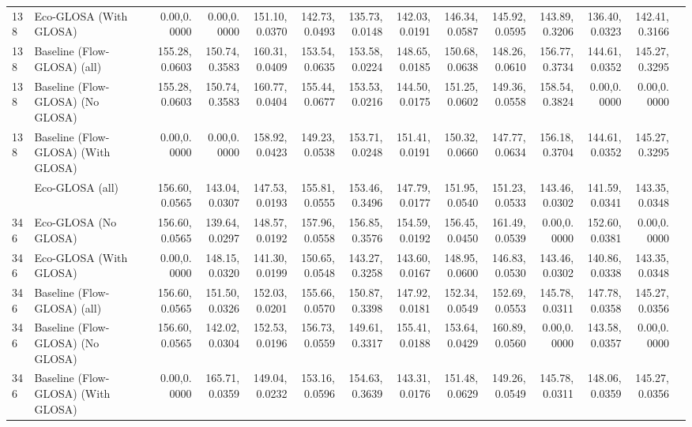 \begin{table}[ht]
{\begin{tabular}{llrrrrrrrrrrrr}
        138  & Eco-GLOSA (With GLOSA)             & 0.00,0.0000   & 0.00,0.0000   & 151.10,0.0370 & 142.73,0.0493 & 135.73,0.0148 & 142.03,0.0191 & 146.34,0.0587 & 145.92,0.0595 & 143.89,0.3206 & 136.40,0.0323 & 142.41,0.3166 \\
        138  & Baseline (Flow-GLOSA) (all)        & 155.28,0.0603 & 150.74,0.3583 & 160.31,0.0409 & 153.54,0.0635 & 153.58,0.0224 & 148.65,0.0185 & 150.68,0.0638 & 148.26,0.0610 & 156.77,0.3734 & 144.61,0.0352 & 145.27,0.3295 \\
        138  & Baseline (Flow-GLOSA) (No GLOSA)   & 155.28,0.0603 & 150.74,0.3583 & 160.77,0.0404 & 155.44,0.0677 & 153.53,0.0216 & 144.50,0.0175 & 151.25,0.0602 & 149.36,0.0558 & 158.54,0.3824 & 0.00,0.0000   & 0.00,0.0000   \\
        138  & Baseline (Flow-GLOSA) (With GLOSA) & 0.00,0.0000   & 0.00,0.0000   & 158.92,0.0423 & 149.23,0.0538 & 153.71,0.0248 & 151.41,0.0191 & 150.32,0.0660 & 147.77,0.0634 & 156.18,0.3704 & 144.61,0.0352 & 145.27,0.3295 \\
        \addlinespace
        346  & Eco-GLOSA (all)                    & 156.60,0.0565 & 143.04,0.0307 & 147.53,0.0193 & 155.81,0.0555 & 153.46,0.3496 & 147.79,0.0177 & 151.95,0.0540 & 151.23,0.0533 & 143.46,0.0302 & 141.59,0.0341 & 143.35,0.0348 \\
        346  & Eco-GLOSA (No GLOSA)               & 156.60,0.0565 & 139.64,0.0297 & 148.57,0.0192 & 157.96,0.0558 & 156.85,0.3576 & 154.59,0.0192 & 156.45,0.0450 & 161.49,0.0539 & 0.00,0.0000   & 152.60,0.0381 & 0.00,0.0000   \\
        346  & Eco-GLOSA (With GLOSA)             & 0.00,0.0000   & 148.15,0.0320 & 141.30,0.0199 & 150.65,0.0548 & 143.27,0.3258 & 143.60,0.0167 & 148.95,0.0600 & 146.83,0.0530 & 143.46,0.0302 & 140.86,0.0338 & 143.35,0.0348 \\
        346  & Baseline (Flow-GLOSA) (all)        & 156.60,0.0565 & 151.50,0.0326 & 152.03,0.0201 & 155.66,0.0570 & 150.87,0.3398 & 147.92,0.0181 & 152.34,0.0549 & 152.69,0.0553 & 145.78,0.0311 & 147.78,0.0358 & 145.27,0.0356 \\
        346  & Baseline (Flow-GLOSA) (No GLOSA)   & 156.60,0.0565 & 142.02,0.0304 & 152.53,0.0196 & 156.73,0.0559 & 149.61,0.3317 & 155.41,0.0188 & 153.64,0.0429 & 160.89,0.0560 & 0.00,0.0000   & 143.58,0.0357 & 0.00,0.0000   \\
        346  & Baseline (Flow-GLOSA) (With GLOSA) & 0.00,0.0000   & 165.71,0.0359 & 149.04,0.0232 & 153.16,0.0596 & 154.63,0.3639 & 143.31,0.0176 & 151.48,0.0629 & 149.26,0.0549 & 145.78,0.0311 & 148.06,0.0359 & 145.27,0.0356 \\

\end{tabular}}
\end{table}

